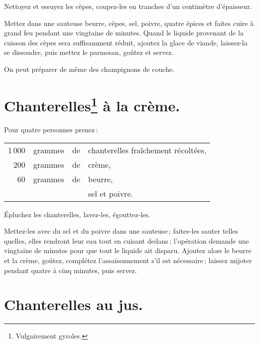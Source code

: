 Nettoyez et essuyez les cèpes, coupez-les en tranches d'un centimètre
d'épaisseur.

Mettez dans une sauteuse beurre, cèpes, sel, poivre, quatre épices et faites
cuire à grand feu pendant une vingtaine de minutes. Quand le liquide provenant
de la cuisson des cèpes sera suffisamment réduit, ajoutez la glace de viande,
laissez-la se dissoudre, puis mettez le parmesan, goûtez et servez.

\sk

On peut préparer de même des champignons de couche.

\section*{\centering Chanterelles\footnote{Vulgairement gyroles.} à la crème.}
{}

Pour quatre personnes prenez :

\footnotesize
\begin{longtable}{rrrp{16em}}
  1 000 & grammes & de & chanterelles fraîchement récoltées,                                              \\
    200 & grammes & de & crème,                                                                           \\
     60 & grammes & de & beurre,                                                                          \\
        &         &    & sel et poivre.                                                                   \\
\end{longtable}
\normalsize

Épluchez les chanterelles, lavez-les, égouttez-les.

Mettez-les avec du sel et du poivre dans une sauteuse ; faites-les sauter
telles quelles, elles rendront leur eau tout en cuisant dedans ; l'opération
demande une vingtaine de minutes pour que tout le liquide ait disparu. Ajoutez
alors le beurre et la crème, goûtez, complétez l'assaisonnement s'il est
nécessaire ; laissez mijoter pendant quatre à cinq minutes, puis servez.

\section*{\centering Chanterelles au jus.}
{}

